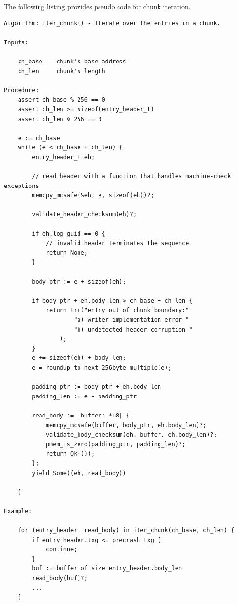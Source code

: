 \documentclass[12pt,a4paper,twoside]{book}
\begin{document}
The following listing provides pseudo code for chunk iteration.
\begin{lstlisting}
Algorithm: iter_chunk() - Iterate over the entries in a chunk.

Inputs:

    ch_base    chunk's base address
    ch_len     chunk's length

Procedure:
    assert ch_base % 256 == 0
    assert ch_len >= sizeof(entry_header_t)
    assert ch_len % 256 == 0

    e := ch_base
    while (e < ch_base + ch_len) {
        entry_header_t eh;

        // read header with a function that handles machine-check exceptions
        memcpy_mcsafe(&eh, e, sizeof(eh))?;

        validate_header_checksum(eh)?;

        if eh.log_guid == 0 {
            // invalid header terminates the sequence
            return None;
        }

        body_ptr := e + sizeof(eh);

        if body_ptr + eh.body_len > ch_base + ch_len {
            return Err("entry out of chunk boundary:"
                    "a) writer implementation error "
                    "b) undetected header corruption "
                );
        }
        e += sizeof(eh) + body_len;
        e = roundup_to_next_256byte_multiple(e);

        padding_ptr := body_ptr + eh.body_len
        padding_len := e - padding_ptr

        read_body := |buffer: *u8| {
            memcpy_mcsafe(buffer, body_ptr, eh.body_len)?;
            validate_body_checksum(eh, buffer, eh.body_len)?;
            pmem_is_zero(padding_ptr, padding_len)?;
            return Ok(());
        };
        yield Some((eh, read_body))

    }

Example:

    for (entry_header, read_body) in iter_chunk(ch_base, ch_len) {
        if entry_header.txg <= precrash_txg {
            continue;
        }
        buf := buffer of size entry_header.body_len
        read_body(buf)?;
        ...
    }
\end{lstlisting}
\end{document}
